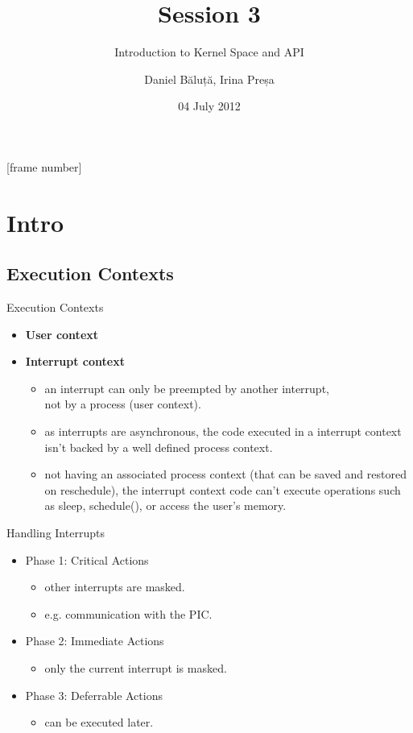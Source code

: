 \documentclass{workshop}
\title[Session 3]{Session 3}
\subtitle{Introduction to Kernel Space and API}
\author{Daniel Băluță, Irina Preșa}
\date{04 July 2012}
\begin{document}
[frame number]

\frame{\titlepage}

\section{Intro}

\subsection{Execution Contexts}
\begin{frame}{Execution Contexts}
\begin{itemize}
\item \textbf{User context}
\item \textbf{Interrupt context}
\begin{itemize}
\item an interrupt can only be preempted by another interrupt,\\ not by a process (user context).
\item as interrupts are asynchronous, the code executed in a interrupt context isn't backed by a well defined process context.
\item not having an associated process context (that can be saved and restored on reschedule), the interrupt context code can't
execute operations such as sleep, schedule(), or access the user's memory.
\end{itemize}
\end{itemize}
\end{frame}

\begin{frame}{Handling Interrupts}
\begin{itemize}
\item Phase 1: Critical Actions
\begin{itemize}
\item other interrupts are masked.
\item e.g. communication with the PIC.
\end{itemize}
\item Phase 2: Immediate Actions
\begin{itemize}
\item only the current interrupt is masked.
\end{itemize}
\item Phase 3: Deferrable Actions
\begin{itemize}
\item can be executed later.
\end{itemize}
\end{itemize}
\end{frame}
\end{document}
